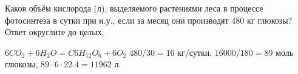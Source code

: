 
Каков
объём кислорода (л), выделяемого растениями леса в процессе фотосинтеза в сутки
при н.у., если за месяц они производят 480 кг глюкозы? Ответ округлите до
целых.

\solutionSection

$6CO_2+6H_2O=C6H_{12}O_6+6O_2$ $480/30 = 16$ кг/сутки. $16000/180=89$ моль глюкозы,  $89 \cdot 6 \cdot 22.4=11962$ л.

